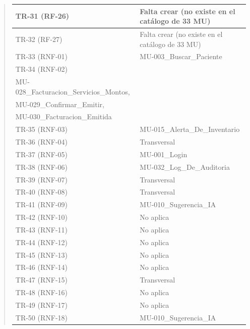 \documentclass[
]{article}
\begin{document}
\begin{quote}
{\begin{longtable}[]{|
  >{\centering\arraybackslash}p{}|
  >{\raggedright\arraybackslash}p{}|}
TR-31 (RF-26) & \begin{minipage}[t]{\linewidth}\raggedright
Falta crear (no existe en el catálogo de 33 MU)
\end{minipage} \\
\hline
TR-32 (RF-27) & \begin{minipage}[t]{\linewidth}\raggedright
Falta crear (no existe en el catálogo de 33 MU)
\end{minipage} \\
\hline
TR-33 (RNF-01) & MU-003\_Buscar\_Paciente \\
\hline
TR-34 (RNF-02) & \begin{minipage}[t]{\linewidth}\raggedright
MU-027\_Facturacion\_Datos\_Del\_Receptor,\\
MU-028\_Facturacion\_Servicios\_Montos,\\
MU-029\_Confirmar\_Emitir,\\
MU-030\_Facturacion\_Emitida
\end{minipage} \\
\hline
TR-35 (RNF-03) & \begin{minipage}[t]{\linewidth}\raggedright
MU-015\_Alerta\_De\_Inventario
\end{minipage} \\
\hline
TR-36 (RNF-04) & Transversal \\
\hline
TR-37 (RNF-05) & MU-001\_Login \\
\hline
TR-38 (RNF-06) & \begin{minipage}[t]{\linewidth}\raggedright
MU-032\_Log\_De\_Auditoria
\end{minipage} \\
\hline
TR-39 (RNF-07) & Transversal \\
\hline
TR-40 (RNF-08) & Transversal \\
\hline
TR-41 (RNF-09) & MU-010\_Sugerencia\_IA \\
\hline
TR-42 (RNF-10) & No aplica \\
\hline
TR-43 (RNF-11) & No aplica \\
\hline
TR-44 (RNF-12) & No aplica \\
\hline
TR-45 (RNF-13) & No aplica \\
\hline
TR-46 (RNF-14) & No aplica \\
\hline
TR-47 (RNF-15) & Transversal \\
\hline
TR-48 (RNF-16) & No aplica \\
\hline
TR-49 (RNF-17) & No aplica \\
\hline
TR-50 (RNF-18) & MU-010\_Sugerencia\_IA \\

\end{longtable}}
\end{quote}
\end{document}
